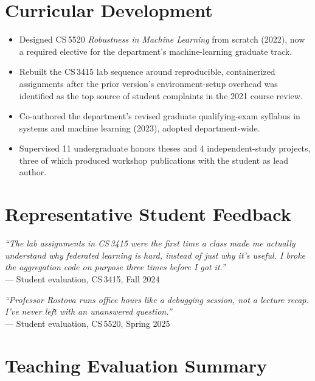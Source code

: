 \section{Curricular Development}
\begin{itemize}
  \item Designed CS\,5520 \emph{Robustness in Machine Learning} from scratch (2022), now a required elective for the department's machine-learning graduate track.
  \item Rebuilt the CS\,3415 lab sequence around reproducible, containerized assignments after the prior version's environment-setup overhead was identified as the top source of student complaints in the 2021 course review.
  \item Co-authored the department's revised graduate qualifying-exam syllabus in systems and machine learning (2023), adopted department-wide.
  \item Supervised 11 undergraduate honors theses and 4 independent-study projects, three of which produced workshop publications with the student as lead author.
\end{itemize}

\section{Representative Student Feedback}
\begin{casebox}
\noindent\textit{``The lab assignments in CS\,3415 were the first time a class made me actually understand why federated learning is hard, instead of just why it's useful. I broke the aggregation code on purpose three times before I got it.''} \\{}
\hfill --- Student evaluation, CS\,3415, Fall 2024

\vspace{0.6em}
\noindent\textit{``Professor Rostova runs office hours like a debugging session, not a lecture recap. I've never left with an unanswered question.''} \\{}
\hfill --- Student evaluation, CS\,5520, Spring 2025
\end{casebox}

\section{Teaching Evaluation Summary}
\par
\begin{minipage}[t]{0.32\linewidth}
\end{minipage}\hfill
\begin{minipage}[t]{0.32\linewidth}
\end{minipage}\hfill
\begin{minipage}[t]{0.32\linewidth}
\end{minipage}
\par
